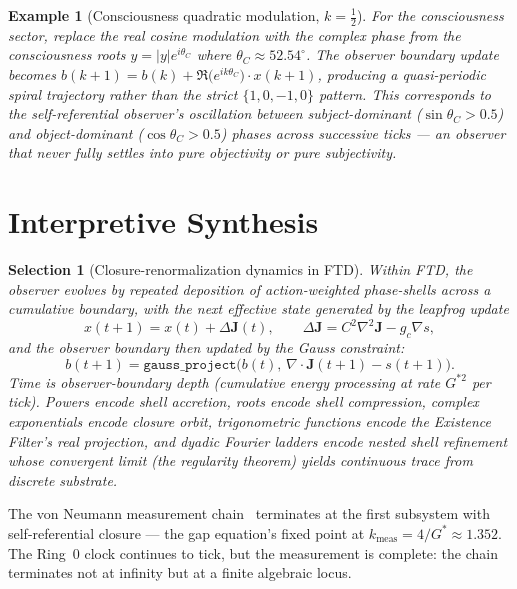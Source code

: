 \documentclass[11pt]{article}
\theoremstyle{tight}
\theoremstyle{plainroman}
\newtheorem{selection}[theorem]{Selection}
\newtheorem{example}[theorem]{Example}
\begin{document}
\begin{example}[Consciousness quadratic modulation, $k=\tfrac12$]
For the consciousness sector, replace the real cosine modulation with the complex phase from the consciousness roots $y=|y|e^{i\theta_C}$ where $\theta_C\approx 52.54^\circ$.
The observer boundary update becomes $b(k+1)=b(k)+\Re\!\bigl(e^{ik\theta_C}\bigr)\cdot x(k+1)$, producing a quasi-periodic spiral trajectory rather than the strict $\{1,0,-1,0\}$ pattern.
This corresponds to the self-referential observer's oscillation between subject-dominant ($\sin\theta_C>0.5$) and object-dominant ($\cos\theta_C>0.5$) phases across successive ticks --- an observer that never fully settles into pure objectivity or pure subjectivity.
\end{example}

\section{Interpretive Synthesis}

\begin{selection}[Closure-renormalization dynamics in FTD]
Within FTD, the observer evolves by repeated deposition of action-weighted phase-shells across a cumulative boundary, with the next effective state generated by the leapfrog update
\[
x(t{+}1)=x(t)+\Delta\mathbf J(t), \qquad \Delta\mathbf J=C^2\nabla^2\mathbf J-g_c\nabla s,
\]
and the observer boundary then updated by the Gauss constraint:
\[
b(t{+}1)=\texttt{gauss\_project}\bigl(b(t),\,\nabla\!\cdot\!\mathbf J(t{+}1)-s(t{+}1)\bigr).
\]
Time is observer-boundary depth (cumulative energy processing at rate $G^{*2}$ per tick).
Powers encode shell accretion, roots encode shell compression, complex exponentials encode closure orbit, trigonometric functions encode the Existence Filter's real projection, and dyadic Fourier ladders encode nested shell refinement whose convergent limit (the regularity theorem) yields continuous trace from discrete substrate.
\end{selection}

The von Neumann measurement chain~\cite{ftdvnc} terminates at the first subsystem with self-referential closure --- the gap equation's fixed point at $k_{\text{meas}}=4/G^*\approx 1.352$.
The Ring~0 clock continues to tick, but the measurement is complete: the chain terminates not at infinity but at a finite algebraic locus.
\end{document}
